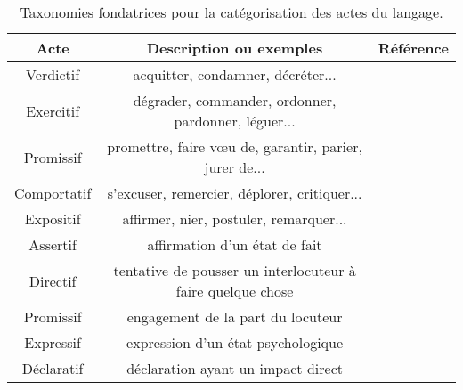 \begin{table}
	\begin{tabularx}{\textwidth}{c c Y}
		\toprule
		Acte & Description ou exemples & Référence \\
		\midrule
		Verdictif & acquitter, condamner, décréter... & \\
		Exercitif & dégrader, commander, ordonner, pardonner, léguer... & \\
		Promissif & promettre, faire vœu de, garantir, parier, jurer de... & \cite{austin1975things} \\
		Comportatif & s’excuser, remercier, déplorer, critiquer... & \\
		Expositif & affirmer, nier, postuler, remarquer... & \\
		\midrule
		Assertif & affirmation d'un état de fait & \\
		Directif & tentative de pousser un interlocuteur à faire quelque chose & \\
		Promissif & engagement de la part du locuteur & \cite{searle1976taxonomy} \\
		Expressif & expression d'un état psychologique & \\
		Déclaratif & déclaration ayant un impact direct & \\
		\bottomrule
	\end{tabularx}
	\caption{Taxonomies fondatrices pour la catégorisation des actes du langage.}
	\label{fig:fundamentalTaxonomies}
\end{table}

